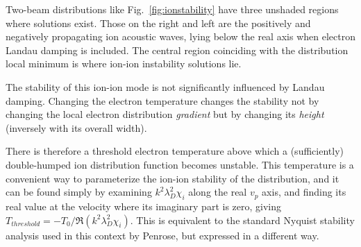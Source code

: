 \documentclass[12pt]{article}
\begin{document}
Two-beam distributions like Fig.\ \ref{fig:ionstability} have three
unshaded regions where solutions exist. Those on the right and left
are the positively and negatively propagating ion acoustic waves,
lying below the real axis when electron Landau damping is
included. The central region coinciding with the distribution local
minimum is where ion-ion instability solutions lie.

The stability of this ion-ion
mode is not significantly influenced by Landau damping. Changing
the electron temperature changes the stability not by changing the
local electron distribution \emph{gradient} but by changing its
\emph{height} (inversely with its overall width).  

There is therefore a threshold electron temperature above which a
(sufficiently) double-humped ion distribution function becomes
unstable. This temperature is a convenient way to parameterize the
ion-ion stability of the distribution, and it can be found simply by
examining $k^2\lambda_D^2\chi_i$ along the real $v_p$ axis, and
finding its real value at the velocity where its imaginary part is
zero, giving $T_{threshold}=-T_0/\Re(k^2\lambda_D^2\chi_i)$. This is
equivalent to the standard Nyquist stability analysis used in this
context by Penrose\cite{Penrose1960}, but expressed in a different way.
\end{document}
